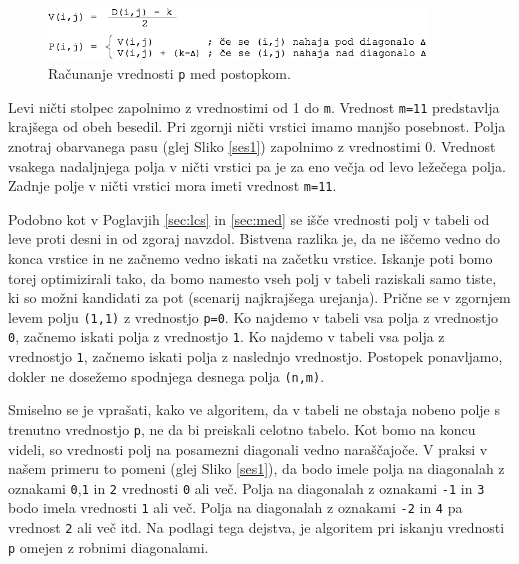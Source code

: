 \documentclass[a4paper, 12pt, twoside]{book}
\begin{document}
\begin{figure}[placement h]
\begin{center}
\includegraphics[width=10cm]{ses2.png}
\end{center}
\caption{Računanje vrednosti {\tt p} med postopkom.}
\label{ses2}
\end{figure}

Levi ničti stolpec zapolnimo z vrednostimi od 1 do {\tt m}. Vrednost {\tt m=11} predstavlja krajšega od obeh besedil. Pri zgornji ničti vrstici imamo manjšo posebnost. Polja znotraj obarvanega pasu (glej Sliko \ref{ses1}) zapolnimo z vrednostimi 0. Vrednost vsakega nadaljnjega polja v ničti vrstici pa je za eno večja od levo ležečega polja. Zadnje polje v ničti vrstici mora imeti vrednost {\tt m=11}.

Podobno kot v Poglavjih \ref{sec:lcs} in \ref{sec:med} se išče vrednosti polj v tabeli od leve proti desni in od zgoraj navzdol. Bistvena razlika je, da ne iščemo vedno do konca vrstice in ne začnemo vedno iskati na začetku vrstice. Iskanje poti bomo torej optimizirali tako, da bomo namesto vseh polj v tabeli raziskali samo tiste, ki so možni kandidati za pot (scenarij najkrajšega urejanja). Prične se v zgornjem levem polju {\tt (1,1)} z vrednostjo {\tt p=0}. Ko najdemo v tabeli vsa polja z vrednostjo {\tt 0}, začnemo iskati polja z vrednostjo {\tt 1}. Ko najdemo v tabeli vsa polja z vrednostjo {\tt 1}, začnemo iskati polja z naslednjo vrednostjo. Postopek ponavljamo, dokler ne dosežemo spodnjega desnega polja {\tt (n,m)}.

Smiselno se je vprašati, kako ve algoritem, da v tabeli ne obstaja nobeno polje s trenutno vrednostjo {\tt p}, ne da bi preiskali celotno tabelo. Kot bomo na koncu videli, so vrednosti polj na posamezni diagonali vedno naraščajoče. V praksi v našem primeru to pomeni (glej Sliko \ref{ses1}), da bodo imele polja na diagonalah z oznakami {\tt 0},{\tt 1} in {\tt 2} vrednosti {\tt 0} ali več. Polja na diagonalah z oznakami {\tt -1} in {\tt 3} bodo imela vrednosti {\tt 1} ali več. Polja na diagonalah z oznakami {\tt -2} in {\tt 4} pa vrednost {\tt 2} ali več itd. Na podlagi tega dejstva, je algoritem pri iskanju vrednosti {\tt p} omejen z robnimi diagonalami.

\pagebreak
\end{document}

